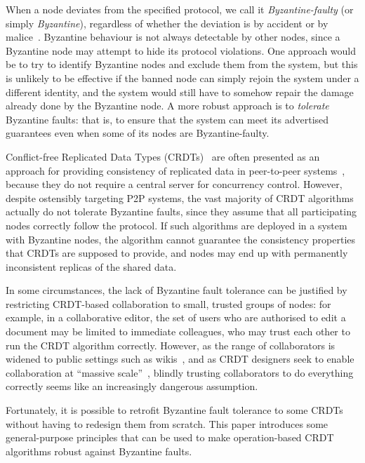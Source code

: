 \documentclass[sigplan,review]{acmart}
\begin{document}
When a node deviates from the specified protocol, we call it \emph{Byzantine-faulty} (or simply \emph{Byzantine}), regardless of whether the deviation is by accident or by malice~\cite{Lamport:1982}.
Byzantine behaviour is not always detectable by other nodes, since a Byzantine node may attempt to hide its protocol violations.
One approach would be to try to identify Byzantine nodes and exclude them from the system, but this is unlikely to be effective if the banned node can simply rejoin the system under a different identity, and the system would still have to somehow repair the damage already done by the Byzantine node.
A more robust approach is to \emph{tolerate} Byzantine faults: that is, to ensure that the system can meet its advertised guarantees even when some of its nodes are Byzantine-faulty.

Conflict-free Replicated Data Types (CRDTs)~\cite{Shapiro:2011} are often presented as an approach for providing consistency of replicated data in peer-to-peer systems~\cite{vanderLinde:2017fu,Weiss:2009ht,Nicolaescu:2016}, because they do not require a central server for concurrency control.
However, despite ostensibly targeting P2P systems, the vast majority of CRDT algorithms actually do not tolerate Byzantine faults, since they assume that all participating nodes correctly follow the protocol.
If such algorithms are deployed in a system with Byzantine nodes, the algorithm cannot guarantee the consistency properties that CRDTs are supposed to provide, and nodes may end up with permanently inconsistent replicas of the shared data.

In some circumstances, the lack of Byzantine fault tolerance can be justified by restricting CRDT-based collaboration to small, trusted groups of nodes: for example, in a collaborative editor, the set of users who are authorised to edit a document may be limited to immediate colleagues, who may trust each other to run the CRDT algorithm correctly.
However, as the range of collaborators is widened to public settings such as wikis~\cite{Nedelec:2016eo,Weiss:2007,Weiss:2009ht}, and as CRDT designers seek to enable collaboration at ``massive scale''~\cite{Andre:2013,Weiss:2009ht,Lv:2016}, blindly trusting collaborators to do everything correctly seems like an increasingly dangerous assumption.

Fortunately, it is possible to retrofit Byzantine fault tolerance to some CRDTs without having to redesign them from scratch.
This paper introduces some general-purpose principles that can be used to make operation-based CRDT algorithms robust against Byzantine faults.
\end{document}
